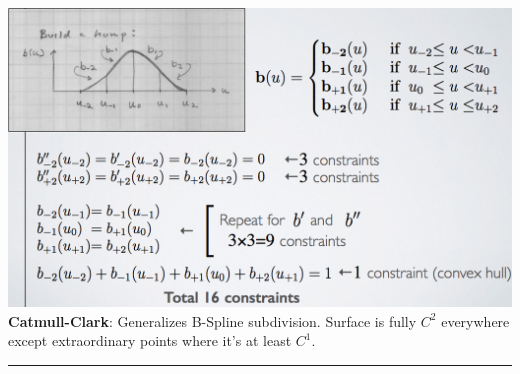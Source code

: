 \documentclass[3pt,landscape]{article}
\begin{document}
\begin{multicols}{3}
\includegraphics[scale=0.20]{images/bspline}\\
{\bf Catmull-Clark}: Generalizes B-Spline subdivision. Surface is fully $C^2$ everywhere except extraordinary points where it's at least $C^1$.



\rule{0.3\linewidth}{0.25pt}
\newpage
\scriptsize


\end{multicols}
\end{document}
